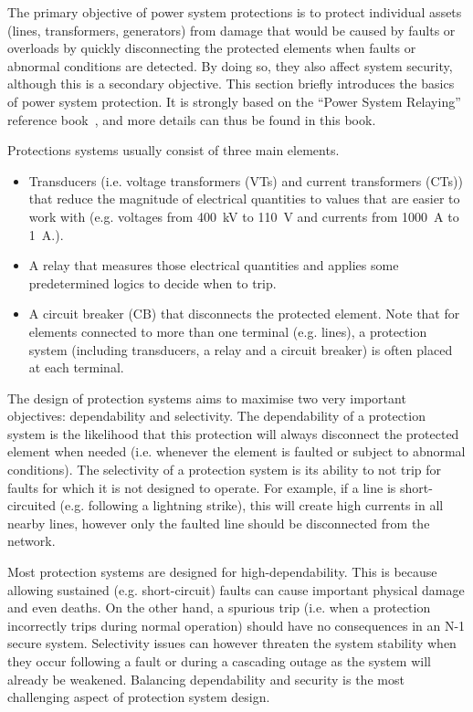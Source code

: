 The primary objective of power system protections is to protect individual assets (lines, transformers, generators) from damage that would be caused by faults or overloads by quickly disconnecting the protected elements when faults or abnormal conditions are detected. By doing so, they also affect system security, although this is a secondary objective. This section briefly introduces the basics of power system protection. It is strongly based on the ``Power System Relaying'' reference book~\cite{HorowitzBook}, and more details can thus be found in this book.

Protections systems usually consist of three main elements.

\begin{itemize}
    \item Transducers (i.e. voltage transformers (VTs) and current transformers (CTs)) that reduce the magnitude of electrical quantities to values that are easier to work with (e.g. voltages from 400~kV to 110~V and currents from 1000~A to 1~A.).
    \item A relay that measures those electrical quantities and applies some predetermined logics to decide when to trip.
    \item A circuit breaker (CB) that disconnects the protected element. Note that for elements connected to more than one terminal (e.g. lines), a protection system (including transducers, a relay and a circuit breaker) is often placed at each terminal.
\end{itemize}

The design of protection systems aims to maximise two very important objectives: dependability and selectivity. The dependability of a protection system is the likelihood that this protection will always disconnect the protected element when needed (i.e. whenever the element is faulted or subject to abnormal conditions). The selectivity of a protection system is its ability to not trip for faults for which it is not designed to operate. For example, if a line is short-circuited (e.g. following a lightning strike), this will create high currents in all nearby lines, however only the faulted line should be disconnected from the network.

Most protection systems are designed for high-dependability. This is because allowing sustained (e.g. short-circuit) faults can cause important physical damage and even deaths. On the other hand, a spurious trip (i.e. when a protection incorrectly trips during normal operation) should have no consequences in an N-1 secure system. Selectivity issues can however threaten the system stability when they occur following a fault or during a cascading outage as the system will already be weakened. Balancing dependability and security is the most challenging aspect of protection system design.

